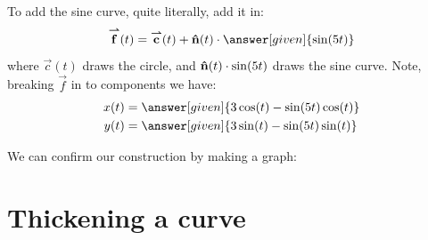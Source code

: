 \documentclass{ximera}
\begin{document}
\begin{example}
\begin{explanation}
\begin{image}
    \end{image}
    To add the sine curve, quite literally, add it in:
    \[
    \vec{f}(t) = \vec{c}(t) + \unormal(t)\cdot \answer[given]{\sin(5t)}
    \]
    where $\vec{c}(t)$ draws the circle, and $\mathbf{\hat{n}}(t)\cdot
    \sin(5t)$ draws the sine curve. Note, breaking $\vec{f}$ in to components we have:
    \begin{align*}
      x(t) &= \answer[given]{3\cos(t)-\sin(5t)\cos(t)}\\
      y(t) &= \answer[given]{3\sin(t)-\sin(5t)\sin(t)}
    \end{align*}
    \begin{onlineOnly}
      We can confirm our construction by making a graph:
      \begin{center}
      \end{center}
    \end{onlineOnly}
  \end{explanation}
\end{example}

\section{Thickening a curve}
\end{document}
